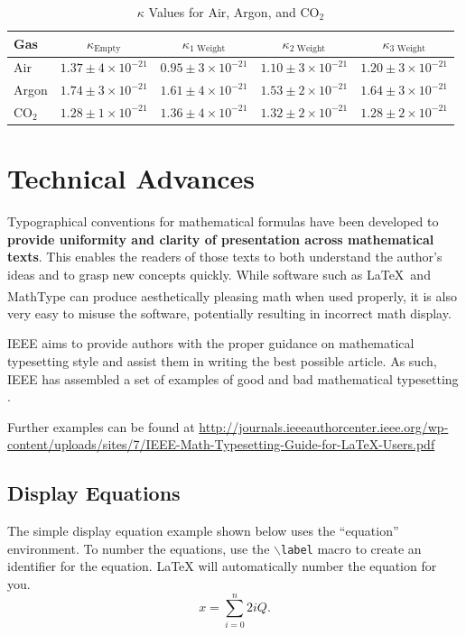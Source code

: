 \documentclass[lettersize,journal]{IEEEtran}
\begin{document}
	
	\begin{table}[!htbp]
		\centering
		\caption{$\kappa$ Values for Air, Argon, and CO$_2$}
		\label{tab:kappa_values}
		\begin{tabular}{lcccc}
			\toprule
			Gas & $\kappa_\text{Empty}$ & $\kappa_\text{1 Weight}$ & $\kappa_\text{2 Weight}$ & $\kappa_\text{3 Weight}$ \\ 
			\midrule
			Air & $1.37 \pm 4 \times 10^{-21}$ & $0.95 \pm 3 \times 10^{-21}$ & $1.10 \pm 3 \times 10^{-21}$ & $1.20 \pm 3 \times 10^{-21}$ \\
			Argon & $1.74 \pm 3 \times 10^{-21}$ & $1.61 \pm 4 \times 10^{-21}$ & $1.53 \pm 2 \times 10^{-21}$ & $1.64 \pm 3 \times 10^{-21}$ \\
			CO$_2$ & $1.28 \pm 1 \times 10^{-21}$ & $1.36 \pm 4 \times 10^{-21}$ & $1.32 \pm 2 \times 10^{-21}$ & $1.28 \pm 2 \times 10^{-21}$ \\
			\bottomrule
		\end{tabular}
	\end{table}
	
	\section{Technical Advances}
	
	Typographical conventions for mathematical formulas have been developed to {\bf provide uniformity and clarity of presentation across mathematical texts}. This enables the readers of those texts to both understand the author's ideas and to grasp new concepts quickly. While software such as \LaTeX \ and MathType\textsuperscript{\textregistered} can produce aesthetically pleasing math when used properly, it is also very easy to misuse the software, potentially resulting in incorrect math display.
	
	IEEE aims to provide authors with the proper guidance on mathematical typesetting style and assist them in writing the best possible article. As such, IEEE has assembled a set of examples of good and bad mathematical typesetting \cite{ref1,ref2,ref3,ref4,ref5}. 
	
	Further examples can be found at \url{http://journals.ieeeauthorcenter.ieee.org/wp-content/uploads/sites/7/IEEE-Math-Typesetting-Guide-for-LaTeX-Users.pdf}
	
	\subsection{Display Equations}
	The simple display equation example shown below uses the ``equation'' environment. To number the equations, use the $\backslash${\tt{label}} macro to create an identifier for the equation. LaTeX will automatically number the equation for you.
	\begin{equation}
		\label{deqn_ex1}
		x = \sum_{i=0}^{n} 2{i} Q.
	\end{equation}
	
\end{document}
